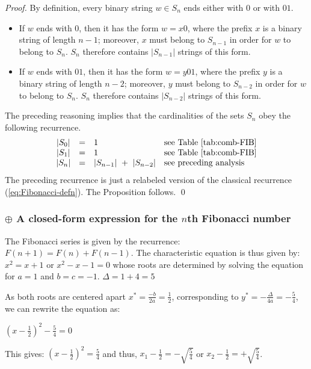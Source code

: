 \begin{proof}
By definition, every binary string $w \in S_n$ ends either with $0$ or
with $01$.
\begin{itemize}
\item
If $w$ ends with $0$, then it has the form $w = x0$, where the prefix
$x$ is a binary string of length $n-1$; moreover, $x$ must belong to
$S_{n-1}$ in order for $w$ to belong to $S_n$.  $S_n$ therefore
contains $|S_{n-1}|$ strings of this form.

\item
If $w$ ends with $01$, then it has the form $w = y01$, where the
prefix $y$ is a binary string of length $n-2$; moreover, $y$ must
belong to $S_{n-2}$ in order for $w$ to belong to $S_n$.  $S_n$
therefore contains $|S_{n-2}|$ strings of this form.
\end{itemize}

The preceding reasoning implies that the cardinalities of the sets
$S_n$ obey the following recurrence.
\[
\begin{array}{ccll}
|S_0| & = & 1 & \mbox{see Table~\ref{tab:comb-FIB}} \\
|S_1| & = & 1 & \mbox{see Table~\ref{tab:comb-FIB}} \\
|S_n| & = & |S_{n-1}| \ + \ |S_{n-2}| & \mbox{see preceding analysis}
\end{array}
\]
The preceding recurrence is just a relabeled version of the classical
recurrence (\ref{eq:Fibonacci-defn}).  The Proposition follows.  \qed
\end{proof}



\subsubsection{$\oplus$  A closed-form expression for the $n$th Fibonacci number}
\label{sec:Fib-Golden-Ratio}


The Fibonacci series is given by the recurrence:
$F(n+1) = F(n) + F(n-1)$.
The characteristic equation is thus given by:
$x^2 = x + 1$ or $x^2 - x - 1 = 0$ whose roots are determined by solving the equation for $a=1$ and $b=c=-1$.
$\Delta = 1+4 = 5$

As both roots are centered apart $x^*=\frac{-b}{2a}= \frac{1}{2}$, corresponding to $y^*= -\frac{\Delta}{4a} = -\frac{5}{4}$, we can rewrite the equation as:

$(x-\frac{1}{2})^2 - \frac{5}{4} = 0$

This gives: $(x-\frac{1}{2})^2 = \frac{5}{4}$ and thus, $x_1-\frac{1}{2} = - \sqrt{\frac{5}{4}}$ or $x_2-\frac{1}{2} = + \sqrt{\frac{5}{4}}$.

